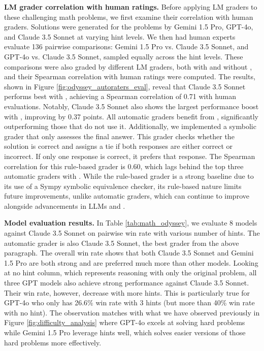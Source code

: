 \textbf{LM grader correlation with human ratings.} Before applying LM graders to these challenging math problems, we first examine their correlation with human graders. Solutions were generated for the problems by Gemini 1.5 Pro, GPT-4o, and Claude 3.5 Sonnet at varying hint levels. We then had human experts evaluate 136 pairwise comparisons: Gemini 1.5 Pro vs. Claude 3.5 Sonnet, and GPT-4o vs. Claude 3.5 Sonnet, sampled equally across the hint levels. These comparisons were also graded by different LM graders, both with and without \PI, and their Spearman correlation with human ratings were computed. The results, shown in Figure \ref{fig:odyssey_autoraters_eval}, reveal that Claude 3.5 Sonnet performs best with \PI, achieving a Spearman correlation of 0.71 with human evaluations. Notably, Claude 3.5 Sonnet also shows the largest performance boost with \PI, improving by 0.37 points. All automatic graders benefit from \PI, significantly outperforming those that do not use it. Additionally, we implemented a symbolic grader that only assesses the final answer. This grader checks whether the solution is correct and assigns a tie if both responses are either correct or incorrect. If only one response is correct, it prefers that response. The Spearman correlation for this rule-based grader is 0.60, which lags behind the top three automatic graders with \PI. While the rule-based grader is a strong baseline due to its use of a Sympy symbolic equivalence checker, its rule-based nature limits future improvements, unlike automatic graders, which can continue to improve alongside advancements in LLMs and \PI.

\textbf{Model evaluation results.} In Table \ref{tab:math_odyssey}, we evaluate 8 models against Claude 3.5 Sonnet on pairwise win rate with various number of hints. The automatic grader is also Claude 3.5 Sonnet, the best grader from the above paragraph. The overall win rate shows that both Claude 3.5 Sonnet and Gemini 1.5 Pro are both strong and are preferred much more than other models. Looking at no hint column, which represents reasoning with only the original problem, all three GPT models also achieve strong performance against Claude 3.5 Sonnet. Their win rate, however, decrease with more hints. This is particularly true for GPT-4o who only has 26.6\% win rate with 3 hints (but more than 40\% win rate with no hint). The observation matches with what we have observed previously in Figure \ref{fig:difficulty_analysis} where GPT-4o excels at solving hard problems while Gemini 1.5 Pro leverage hints well, which solves easier versions of those hard problems more effectively.


